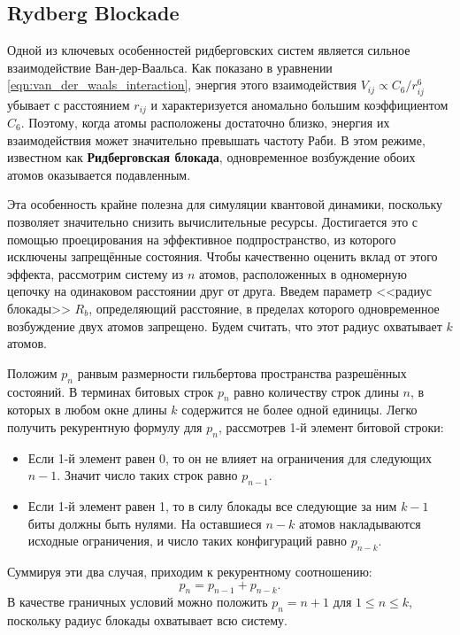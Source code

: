 \subsection{Rydberg Blockade} \label{sec:bloqade}
Одной из ключевых особенностей ридберговских систем является сильное взаимодействие Ван-дер-Ваальса. Как показано в уравнении \ref{eqn:van_der_waals_interaction}, энергия этого взаимодействия $V_{ij} \propto C_6/r_{ij}^6$ убывает с расстоянием $r_{ij}$ и характеризуется аномально большим коэффициентом $C_6$. Поэтому, когда атомы расположены достаточно близко, энергия их взаимодействия может значительно превышать частоту Раби. В этом режиме, известном как \textbf{Ридберговская блокада}, одновременное возбуждение обоих атомов оказывается подавленным.

Эта особенность крайне полезна для симуляции квантовой динамики, поскольку позволяет значительно снизить вычислительные ресурсы. Достигается это с помощью проецирования на эффективное подпространство, из которого исключены запрещённые состояния. Чтобы качественно оценить вклад от этого эффекта, рассмотрим систему из $n$ атомов, расположенных в одномерную цепочку на одинаковом расстоянии друг от друга. Введем параметр <<радиус блокады>> $R_b$, определяющий расстояние, в пределах которого одновременное возбуждение двух атомов запрещено. Будем считать, что этот радиус охватывает $k$ атомов.

Положим $p_n$ ранвым размерности гильбертова пространства разрешённых состояний. В терминах битовых строк $p_n$ равно количеству строк длины $n$, в которых в любом окне длины $k$ содержится не более одной единицы. Легко получить рекурентную формулу для $p_n$, рассмотрев 1-й элемент битовой строки:
\begin{itemize}
    \item Если 1-й элемент равен 0, то он не влияет на ограничения для следующих $n-1$. Значит число таких строк равно $p_{n-1}$.
    \item Если 1-й элемент равен 1, то в силу блокады все следующие за ним $k-1$ биты должны быть нулями. На оставшиеся $n-k$ атомов накладываются исходные ограничения, и число таких конфигураций равно $p_{n-k}$.
\end{itemize}
Суммируя эти два случая, приходим к рекурентному соотношению:
\begin{equation}
    p_n = p_{n-1} + p_{n-k}.
    \label{eqn:blockade_recurrence}
\end{equation}
В качестве граничных условий можно положить $p_n = n+1$ для $1 \le n \le k$, поскольку радиус блокады охватывает всю систему.

